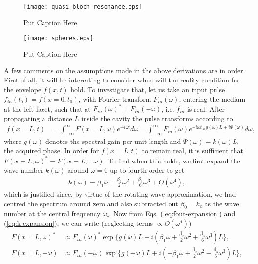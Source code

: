 \documentclass[]{spie}  %
\begin{document}
\begin{figure}[h!]
	\begin{center}
		\texttt{[image: quasi-bloch-resonance.eps]}
		\caption{ Put Caption Here } \label{fig:quasi-bloch-resonance}
	\end{center}	
\end{figure}



\begin{figure}[h!]
	\begin{center}
		\texttt{[image: spheres.eps]}
		\caption{ Put Caption Here } \label{fig:spheres}
	\end{center}	
\end{figure}


A few comments on the assumptions made in the above derivations are in order. First of all, it will be interesting to consider when will the reality condition for the envelope $f(x,t) $  hold. To investigate that, let us take an input pulse $f_{in}(t_0) = f(x=0,t_0)$, with Fourier transform $F_{in}(\omega)$, entering the medium at the left facet, such that at $F_{in}(\omega)^* = F_{in}(-\omega)$, i.e. $f_{in}$ is real. After propagating a distance $L$ inside the cavity the pulse transforms according to \cite{weiner2011ultrafast}
\begin{align}
\label{eq:fout-expansion}
f(x=L,t) &= \int_{-\infty}^{\infty} F(x=L,\omega)e^{-i\omega t}d\omega = \int_{-\infty}^{\infty} F_{in}(\omega)e^{-i\omega t}e^{g(\omega)L+i\Psi(\omega)}d\omega,
\end{align}
where $g(\omega)$ denotes the spectral gain per unit length and $\Psi(\omega)=k(\omega)L$, the acquired phase. In order for $f(x=L,t)$ to remain real, it is sufficient that $F(x=L,\omega)^*= F(x=L,-\omega)$. To find when this holds, we first expand the wave number $k(\omega)$ around $\omega=0$ up to fourth order to get  
\begin{align}
\label{eq:k-expansion}
k(\omega) = \beta_1\omega + \frac{\beta_2}{2}\omega^2 + \frac{\beta_3}{6}\omega^3 + O(\omega^4), 
\end{align}
which is justified since, by virtue of the rotating wave approximation, we had centred the spectrum around zero and also subtracted out $\beta_0 = k_c$ as the wave number at the central frequency $\omega_c$. Now from Eqs. (\ref{eq:fout-expansion}) and (\ref{eq:k-expansion}), we can write (neglecting terms $\propto O(\omega^4)$)
\begin{subequations}
	\begin{align}
		F(x=L,\omega)^* &\approx F_{in}(\omega)^* \exp\{g(\omega)L-i(\beta_1\omega + \frac{\beta_2}{2}\omega^2 + \frac{\beta_3}{6}\omega^3 )L\}, \\
		F(x=L,-\omega) &\approx F_{in}(-\omega) \exp\{g(-\omega)L+i(-\beta_1\omega + \frac{\beta_2}{2}\omega^2 - \frac{\beta_3}{6}\omega^3 )L\},
	\end{align}
\end{subequations}
\end{document}
